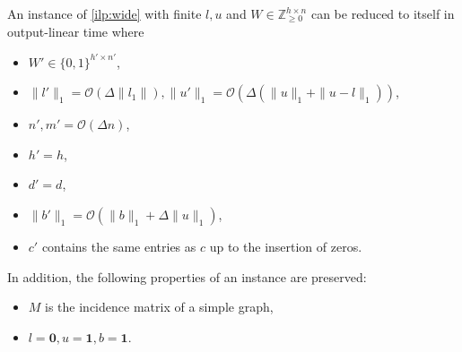 \documentclass[a4paper,UKenglish,cleveref,thm-restate]{lipics-v2021}
\newcommand{\Z}{\mathbb Z}
\newcommand{\veczero}{\mathbf0}
\newcommand{\vecone}{\mathbf1}
\renewcommand{\O}{\mathcal O}
\begin{document}
\begin{lemma}
    An instance of \cref{ilp:wide} with finite $l,u$ and $W\in\Z_{\ge0}^{h\times n}$ can be reduced to itself in output-linear time where
    \begin{itemize}
        \item $W'\in\{0,1\}^{h'\times n'}$,
        \item $\|l'\|_1=\O(\Delta\|l_1\|),\|u'\|_1=\O(\Delta(\|u\|_1+\|u-l\|_1))$,
        \item $n',m'=\O(\Delta n)$,
        \item $h'=h$,
        \item $d'=d$,
        \item $\|b'\|_1=\O(\|b\|_1+\Delta\|u\|_1)$,
        \item $c'$ contains the same entries as $c$ up to the insertion of zeros.
    \end{itemize}
    In addition, the following properties of an instance are preserved:
    \begin{itemize}
        \item $M$ is the incidence matrix of a simple graph,
        \item $l=\veczero,u=\vecone,b=\vecone$.
    \end{itemize}
    \label{lemma:wide-coefficient-reduction}
\end{lemma}
\end{document}
